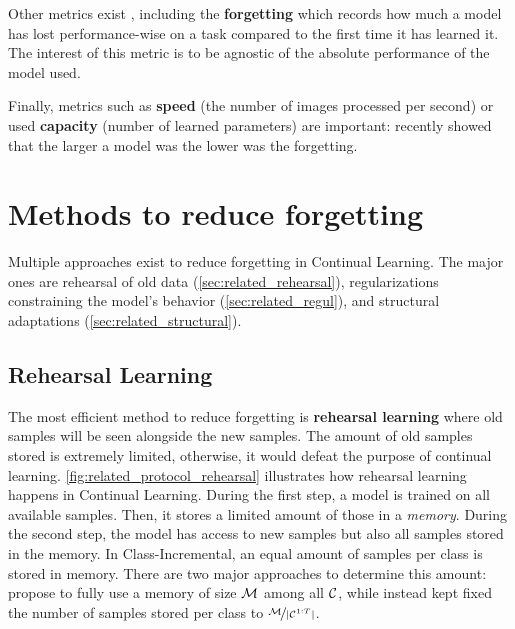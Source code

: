 Other metrics exist \citep{diaz2018continualmetrics}, including the \textbf{forgetting}
\citep{chaudhry2018riemannien_walk} which records how much a model has lost performance-wise on a
task compared to the first time it has learned it. The interest of this metric is to be agnostic of
the absolute performance of the model used.

Finally, metrics such as \textbf{speed} (\ie the number of images processed per second) or used
\textbf{capacity} (\ie number of learned parameters) are important:
\citet{ramasesh2022scalecontinual} recently showed that the larger a model was the lower was the
forgetting.

\section{Methods to reduce forgetting}
\label{sec:related_methods}

Multiple approaches exist to reduce forgetting in Continual Learning. The major ones are
rehearsal of old data (\autoref{sec:related_rehearsal}), regularizations constraining the model's
behavior (\autoref{sec:related_regul}), and structural adaptations (\autoref{sec:related_structural}).

\subsection{Rehearsal Learning}
\label{sec:related_rehearsal}

The most efficient method to reduce forgetting is \textbf{rehearsal learning} where old samples will
be seen alongside the new samples. The amount of old samples stored is extremely limited, otherwise,
it would defeat the purpose of continual learning. \autoref{fig:related_protocol_rehearsal} illustrates how
rehearsal learning happens in Continual Learning. During the first step, a model is trained on all
available samples. Then, it stores a limited amount of those in a \textit{memory}. During the second
step, the model has access to new samples but also all samples stored in the memory. In
Class-Incremental, an equal amount of samples per class is stored in memory. There are
two major approaches to determine this amount: \citet{rebuffi2017icarl} propose to fully use a
memory of size $\mathcal{M}$ among all $\mathcal{C}$, while \citet{hou2019ucir} instead kept fixed the number of
samples stored per class to $\nicefrac{\mathcal{M}}{|\mathcal{C}^{1:T}|}$.

